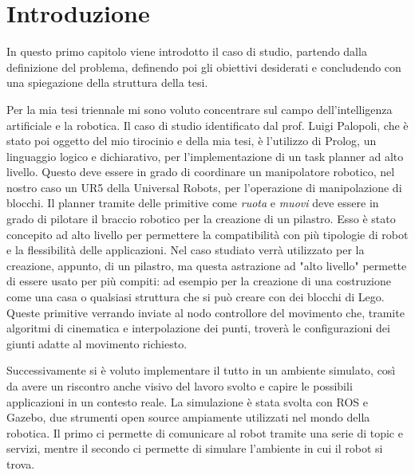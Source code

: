 \chapter{Introduzione}
\label{cha:intro}


In questo primo capitolo viene introdotto il caso di studio, partendo dalla definizione del problema, definendo poi gli obiettivi desiderati
e concludendo con una spiegazione della struttura della tesi.

Per la mia tesi triennale mi sono voluto concentrare sul campo dell'intelligenza artificiale e la robotica. Il caso di studio identificato
dal prof. Luigi Palopoli, che è stato poi oggetto del mio tirocinio e della mia tesi, è l'utilizzo di Prolog, un linguaggio logico e dichiarativo, per l'implementazione di un task planner ad alto livello.
Questo deve essere in grado di coordinare un manipolatore robotico, nel nostro caso un UR5 della Universal Robots, per l'operazione di manipolazione di blocchi.
Il planner tramite delle primitive come \textit{ruota} e \textit{muovi} deve essere in grado di pilotare il braccio robotico per la
creazione di un pilastro. Esso è stato concepito ad alto livello per permettere la compatibilità con più tipologie di robot e la flessibilità
delle applicazioni. Nel caso studiato verrà utilizzato per la creazione, appunto, di un pilastro, ma questa astrazione ad
"alto livello" permette di essere usato per più compiti: ad esempio per la creazione di una costruzione come una casa o qualsiasi struttura
che si può creare con dei blocchi di Lego. Queste primitive verrando inviate al nodo controllore del movimento che, tramite algoritmi di cinematica e
interpolazione dei punti, troverà le configurazioni dei giunti adatte al movimento richiesto. 

Successivamente si è voluto implementare il tutto in un
ambiente simulato, così da avere un riscontro anche visivo del lavoro svolto e capire le possibili applicazioni in un contesto reale.
La simulazione è stata svolta con ROS e Gazebo, due strumenti open source ampiamente utilizzati nel mondo della robotica. Il primo ci permette di
comunicare al robot tramite una serie di topic e servizi, mentre il secondo ci permette di simulare l'ambiente in cui il robot si trova.

